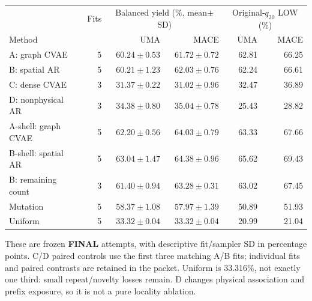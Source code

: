\begin{center}\small
\begin{tabular}{lrrrrr}\toprule
& Fits &\multicolumn{2}{c}{Balanced yield (\%, mean$\pm$SD)}&\multicolumn{2}{c}{Original-$q_{20}$ LOW (\%)}\\
Method & &UMA&MACE&UMA&MACE\\\midrule
A: graph CVAE&5&$60.24\pm0.53$&$61.72\pm0.72$&62.81&66.25\\
B: spatial AR&5&$60.21\pm1.23$&$62.03\pm0.76$&62.24&66.61\\
C: dense CVAE&3&$31.37\pm0.22$&$31.02\pm0.96$&32.47&36.89\\
D: nonphysical AR&3&$34.38\pm0.80$&$35.04\pm0.78$&25.43&28.82\\
A-shell: graph CVAE&5&$62.20\pm0.56$&$64.03\pm0.79$&63.33&67.66\\
B-shell: spatial AR&5&$63.04\pm1.47$&$64.38\pm0.96$&65.62&69.43\\
B: remaining count&3&$61.40\pm0.94$&$63.28\pm0.31$&63.02&67.45\\
Mutation&5&$58.37\pm1.08$&$57.97\pm1.39$&50.89&51.93\\
Uniform&5&$33.32\pm0.04$&$33.32\pm0.04$&20.99&21.04\\
\bottomrule\end{tabular}\end{center}
These are frozen \textbf{FINAL} attempts, with descriptive fit/sampler SD in
percentage points. C/D paired controls use the first three matching A/B fits;
individual fits and paired contrasts are retained in the packet.
Uniform is 33.316\%, not exactly one third: small repeat/novelty losses remain.
D changes physical association and prefix exposure, so it is not a pure locality ablation.
